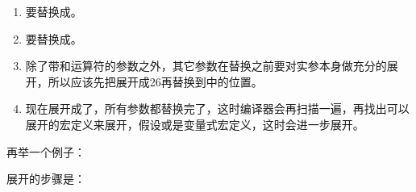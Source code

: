 \begin{enumerate}

\item {}要替换成。

\item {}要替换成。

\item 除了带\BookCode{\#}和\BookCode{\#\#}运算符的参数之外，其它参数在替换之前要对实参本身做充分的展开，所以应该先把展开成26再替换到中的位置。

\item 现在展开成了，所有参数都替换完了，这时编译器会再扫描一遍，再找出可以展开的宏定义来展开，假设或是变量式宏定义，这时会进一步展开。
\end{enumerate}


再举一个例子：




展开的步骤是：



